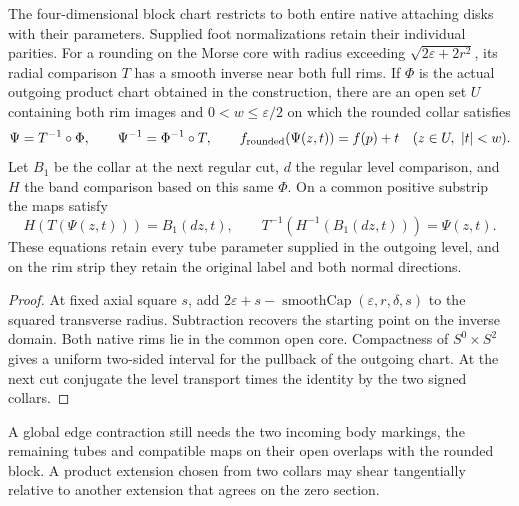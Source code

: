 \begin{theorem}
\label{thm:ed03-rounded-native-rims}
\leanok
The four-dimensional block chart restricts to both entire native attaching
disks with their parameters. Supplied foot normalizations retain their
individual parities. For a rounding on the Morse core with radius exceeding
$\sqrt{2\varepsilon+2r^2}$, its radial comparison $T$ has a smooth inverse
near both full rims. If $\Phi$ is the actual outgoing product chart obtained
in the construction, there are an open set $U$ containing both rim images and
$0<w\le\varepsilon/2$ on which the rounded collar satisfies
\[
 \Psi=T^{-1}\circ\Phi,\qquad
 \Psi^{-1}=\Phi^{-1}\circ T,\qquad
 f_{\rm rounded}(\Psi(z,t))=f(p)+t
 \quad(z\in U,\ |t|<w).
\]
Let $B_1$ be the collar at the next regular cut, $d$ the regular level
comparison, and $H$ the band comparison based on this same $\Phi$. On
a common positive substrip the maps satisfy
\[
 H(T(\Psi(z,t)))=B_1(dz,t),\qquad
 T^{-1}(H^{-1}(B_1(dz,t)))=\Psi(z,t).
\]
These equations retain every tube parameter supplied in the outgoing level,
and on the rim strip they retain the original label and both normal directions.
\end{theorem}
\begin{proof}
\leanok
At fixed axial square $s$, add $2\varepsilon+s-\operatorname{smoothCap}
(\varepsilon,r,\delta,s)$ to the squared transverse radius. Subtraction
recovers the starting point on the inverse domain. Both native rims lie
in the common open core. Compactness of $S^0\times S^2$ gives a uniform
two-sided interval for the pullback of the outgoing chart. At the next cut
conjugate the level transport times the identity by the two signed collars.
\end{proof}
A global edge contraction still needs the two incoming body markings, the
remaining tubes and compatible maps on their open overlaps with the rounded
block. A product extension chosen from two collars may shear tangentially
relative to another extension that agrees on the zero section.

